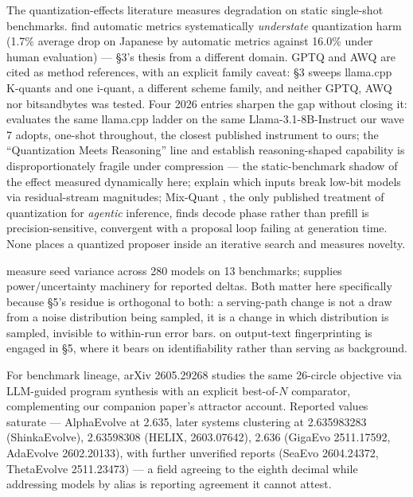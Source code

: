 The quantization-effects literature measures degradation on static single-shot benchmarks. \citet{marchisio2024doesquantizationaffectmultilingual} find automatic metrics systematically \emph{understate} quantization harm (1.7\% average drop on Japanese by automatic metrics against 16.0\% under human evaluation) --- \S3's thesis from a different domain. GPTQ \citep{frantar2023gptqaccurateposttrainingquantization} and AWQ \citep{lin2024awqactivationawareweightquantization} are cited as method references, with an explicit family caveat: \S3 sweeps llama.cpp K-quants and one i-quant, a different scheme family, and neither GPTQ, AWQ nor bitsandbytes was tested. Four 2026 entries sharpen the gap without closing it: \citet{kurt2026quantizationiuseunified} evaluates the same llama.cpp ladder on the same Llama-3.1-8B-Instruct our wave 7 adopts, one-shot throughout, the closest published instrument to ours; the ``Quantization Meets Reasoning'' line \citep{li2025quantizationmeetsreasoningexploring,li2026quantizationmeetsreasoningexploring} and \citet{lv2026makeslowbitquantizationawaretraining} establish reasoning-shaped capability is disproportionately fragile under compression --- the static-benchmark shadow of the effect measured dynamically here; \citet{chang2025inputsbreaklowbitllm} explain which inputs break low-bit models via residual-stream magnitudes; Mix-Quant \citep{lu2026mixquantquantizedprefillingprecise}, the only published treatment of quantization for \emph{agentic} inference, finds decode phase rather than prefill is precision-sensitive, convergent with a proposal loop failing at generation time. None places a quantized proposer inside an iterative search and measures novelty.

\citet{madaan2024quantifyingvarianceevaluationbenchmarks} measure seed variance across 280 models on 13 benchmarks; \citet{miller2024addingerrorbarsevals} supplies power/uncertainty machinery for reported deltas. Both matter here specifically because \S5's residue is orthogonal to both: a serving-path change is not a draw from a noise distribution being sampled, it is a change in which distribution is sampled, invisible to within-run error bars. \citet{wimbauer2026fingerprintinginferencesystemslarge} on output-text fingerprinting is engaged in \S5, where it bears on identifiability rather than serving as background.

For benchmark lineage, arXiv 2605.29268 studies the same 26-circle objective via LLM-guided program synthesis with an explicit best-of-$N$ comparator, complementing our companion paper's attractor account. Reported values saturate --- AlphaEvolve at 2.635, later systems clustering at 2.635983283 (ShinkaEvolve), 2.63598308 (HELIX, 2603.07642), 2.636 (GigaEvo 2511.17592, AdaEvolve 2602.20133), with further unverified reports (SeaEvo 2604.24372, ThetaEvolve 2511.23473) --- a field agreeing to the eighth decimal while addressing models by alias is reporting agreement it cannot attest.

